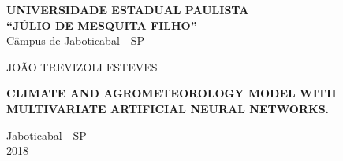 \thispagestyle{empty}


\begin{center}
\textbf{UNIVERSIDADE ESTADUAL PAULISTA}\\
\textbf{``JÚLIO DE MESQUITA FILHO''}\\
Câmpus de Jaboticabal - SP
\end{center}

\vspace{3.5cm}
\centerline{{\normalsize{JOÃO TREVIZOLI ESTEVES}}}

\vspace*{4.5cm}


\begin{center}
\Large\textrm{\textbf{CLIMATE AND AGROMETEOROLOGY MODEL WITH MULTIVARIATE ARTIFICIAL NEURAL NETWORKS.}} %
\end{center}


\vspace*{9.0cm}
\begin{center}
Jaboticabal - SP\\ 
2018
\end{center}

\newpage
